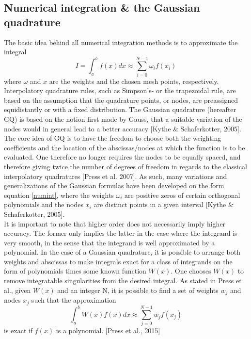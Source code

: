\documentclass[%
reprint,
amsmath,amssymb,
aps,
]{revtex4-1}
\begin{document}
\subsection{Numerical integration \& the Gaussian quadrature} \noindent 
The basic idea behind all numerical integration methods is to approximate the integral 
\begin{equation}\label{numint}
	I = \int_{a}^{b}f(x)dx \approx \sum_{i=0}^{N-1} \omega_if(x_i)
\end{equation}
where $\omega$ and $x$ are the weights and the chosen mesh points, respectively. Interpolatory quadrature rules, such as Simpson's- or the trapezoidal rule, are based on the assumption that the quadrature points, or nodes, are preassigned equidistantly or with a fixed distribution. The Gaussian quadrature (hereafter GQ) is based on the notion first made by Gauss, that a suitable variation of the nodes would in general lead to a better accuracy [Kythe \& Schaferkotter, 2005]. The core idea of GQ is to have the freedom to choose both the weighting coefficients and the location of the abscissas/nodes at which the function is to be evaluated. One therefore no longer requires the nodes to be equally spaced, and therefore giving twice the number of degrees of freedom in regards to the classical interpolatory quadratures [Press et al. 2007]. As such, many variations and generalizations of the Gaussian formulas have been developed on the form equation \ref{numint}, where the weights $\omega_i$ are positive zeros of certain orthogonal polynomials and the nodes $x_i$ are distinct points in a given interval [Kythe \& Schaferkotter, 2005]. \\
\indent It is important to note that higher order does not necessarily imply higher accuracy. The former only implies the latter in the case where the integrand is very smooth, in the sense that the integrand is well approximated by a polynomial. In the case of a Gaussian quadrature, it is possible to arrange both weights and abscissas to make integrals exact for a class of integrands on the form of polynomials times some known function $W(x)$. One chooses $W(x)$ to remove integratable singularities from the desired integral. As stated in Press et al., given $W(x)$ and an integer N, it is possible to find a set of weights $w_j$ and nodes $x_j$ such that the approximation 
\begin{equation}
	\int_{a}^{b}W(x)f(x)dx \approx \sum_{j = 0}^{N-1}w_jf(x_j)
\end{equation}
is exact if $f(x)$ is a polynomial. [Press et al., 2015]
\end{document}
